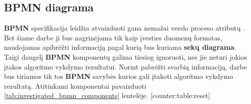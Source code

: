 \documentclass{VUMIFInfBakalaurinis}
\begin{document}
\subsection{BPMN diagrama}
\textbf{BPMN} specifikacija leidžia atvaizduoti gana nemažai verslo proceso atributų \cite{bpmnFormal}. Bet šiame darbe ji bus nagrinėjama tik kaip įvesties duomenų formatas, naudojamas apibrėžti informaciją pagal kurią bus kuriama \textbf{sekų diagrama}. Taigi daugelį \textbf{BPMN} komponentų galima tiesiog ignoruoti, nes jie neturi jokios įtakos algoritmo vykdymo rezultatui. Norint pabrėžti svarbią informaciją, darbe bus tiriamos tik tos \textbf{BPMN} savybės kurios gali įtakoti algoritmo vykdymo rezultatą. Atitinkami komponentai pavaizduoti \ref{tab:investigated_bpmn_components} lentelėje.
[counter:table:reset]
\newcommand\rownumber{\stepcounter{counter:table}\arabic{counter:table}}
\end{document}
